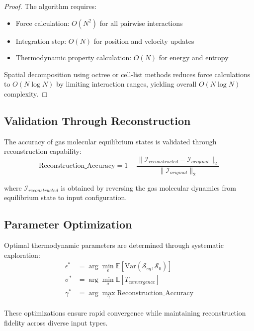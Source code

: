 \begin{proof}
The algorithm requires:
\begin{itemize}
\item Force calculation: $O(N^2)$ for all pairwise interactions
\item Integration step: $O(N)$ for position and velocity updates  
\item Thermodynamic property calculation: $O(N)$ for energy and entropy
\end{itemize}

Spatial decomposition using octree or cell-list methods reduces force calculations to $O(N \log N)$ by limiting interaction ranges, yielding overall $O(N \log N)$ complexity.
\end{proof}

\subsection{Validation Through Reconstruction}

The accuracy of gas molecular equilibrium states is validated through reconstruction capability:
\begin{equation}
\text{Reconstruction\_Accuracy} = 1 - \frac{\|\mathcal{I}_{reconstructed} - \mathcal{I}_{original}\|_2}{\|\mathcal{I}_{original}\|_2}
\label{eq:reconstruction-accuracy}
\end{equation}

where $\mathcal{I}_{reconstructed}$ is obtained by reversing the gas molecular dynamics from equilibrium state to input configuration.

\subsection{Parameter Optimization}

Optimal thermodynamic parameters are determined through systematic exploration:
\begin{align}
\epsilon^* &= \arg\min_{\epsilon} \mathbb{E}[\text{Var}(\mathcal{S}_{eq}, \mathcal{S}_0)] \label{eq:epsilon-optimization} \\
\sigma^* &= \arg\min_{\sigma} \mathbb{E}[T_{convergence}] \label{eq:sigma-optimization} \\
\gamma^* &= \arg\max_{\gamma} \text{Reconstruction\_Accuracy} \label{eq:gamma-optimization}
\end{align}

These optimizations ensure rapid convergence while maintaining reconstruction fidelity across diverse input types.

